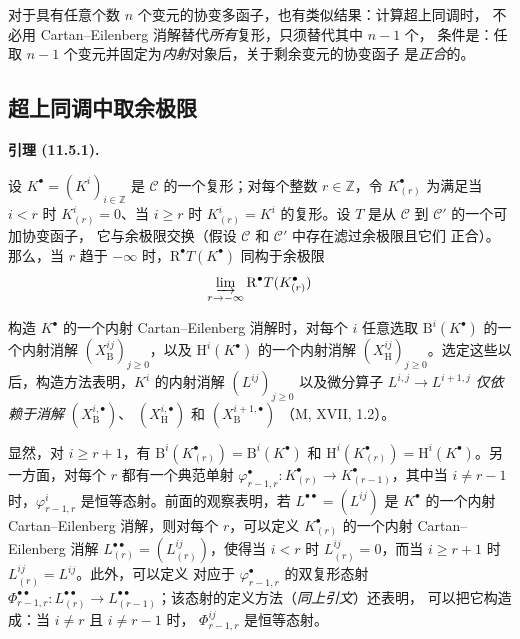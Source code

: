 \documentclass[UTF8,fontset=none,11pt,oneside,openany]{ctexbook}
\newenvironment{lemma}[1][]{%
  \par\medskip\noindent\textbf{引理 (#1).}\ %
}{\par}
\newcommand{\oldpage}[2][]{%
  \hypertarget{ega-source-page-#1-#2}{}%
  \marginnote{\scriptsize\textbf{#1}~|~#2}\ignorespaces}
\let\EGAOriginalLabel\label
\renewcommand{\label}[1]{\phantomsection\EGAOriginalLabel{#1}}
\begin{document}
对于具有任意个数 $n$ 个变元的协变多函子，也有类似结果：计算超上同调时，
不必用 Cartan--Eilenberg 消解替代\emph{所有}复形，只须替代其中 $n-1$ 个，
条件是：任取 $n-1$ 个变元并固定为\emph{内射}对象后，关于剩余变元的协变函子
是\emph{正合}的。

\subsection{超上同调中取余极限}
\label{subsection:0.11.5-fr}

\begin{lemma}[11.5.1]
\label{0.11.5.1-fr}
设 $K^\bullet=(K^i)_{i\in\mathbb Z}$ 是 $\mathcal C$ 的一个复形；对每个整数
$r\in\mathbb Z$，令 $K_{(r)}^\bullet$ 为满足当 $i<r$ 时
$K_{(r)}^i=0$、当 $i\geq r$ 时 $K_{(r)}^i=K^i$ 的复形。设 $T$ 是从
$\mathcal C$ 到 $\mathcal C'$ 的一个可加协变函子，
\oldpage[0\textsubscript{III}]{36}
它与余极限交换（假设 $\mathcal C$ 和 $\mathcal C'$ 中存在滤过余极限且它们
正合）。那么，当 $r$ 趋于 $-\infty$ 时，$\mathrm R^\bullet T(K^\bullet)$
同构于余极限
\[
  \varinjlim_{r\to-\infty}\mathrm R^\bullet T(K_{(r)}^\bullet)
\]
\end{lemma}

构造 $K^\bullet$ 的一个内射 Cartan--Eilenberg 消解时，对每个 $i$ 任意选取
$\mathrm B^i(K^\bullet)$ 的一个内射消解
$(X_{\mathrm B}^{ij})_{j\geq0}$，以及 $\mathrm H^i(K^\bullet)$ 的一个内射消解
$(X_{\mathrm H}^{ij})_{j\geq0}$。选定这些以后，构造方法表明，$K^i$ 的内射消解
$(L^{ij})_{j\geq0}$ 以及微分算子 $L^{i,j}\to L^{i+1,j}$
\emph{仅依赖于消解} $(X_{\mathrm B}^{i,\bullet})$、
$(X_{\mathrm H}^{i,\bullet})$ 和 $(X_{\mathrm B}^{i+1,\bullet})$
（M, XVII, 1.2）。

显然，对 $i\geq r+1$，有
$\mathrm B^i(K_{(r)}^\bullet)=\mathrm B^i(K^\bullet)$ 和
$\mathrm H^i(K_{(r)}^\bullet)=\mathrm H^i(K^\bullet)$。另一方面，对每个 $r$
都有一个典范单射
$\varphi_{r-1,r}^\bullet:K_{(r)}^\bullet\to K_{(r-1)}^\bullet$，其中当
$i\neq r-1$ 时，$\varphi_{r-1,r}^i$ 是恒等态射。前面的观察表明，若
$L^{\bullet\bullet}=(L^{ij})$ 是 $K^\bullet$ 的一个内射
Cartan--Eilenberg 消解，则对每个 $r$，可以定义 $K_{(r)}^\bullet$ 的一个内射
Cartan--Eilenberg 消解
$L_{(r)}^{\bullet\bullet}=(L_{(r)}^{ij})$，使得当 $i<r$ 时
$L_{(r)}^{ij}=0$，而当 $i\geq r+1$ 时 $L_{(r)}^{ij}=L^{ij}$。此外，可以定义
对应于 $\varphi_{r-1,r}^\bullet$ 的双复形态射
$\Phi_{r-1,r}^{\bullet\bullet}:L_{(r)}^{\bullet\bullet}\to
L_{(r-1)}^{\bullet\bullet}$；该态射的定义方法（\emph{同上引文}）还表明，
可以把它构造成：当 $i\neq r$ 且 $i\neq r-1$ 时，
$\Phi_{r-1,r}^{ij}$ 是恒等态射。
\end{document}
